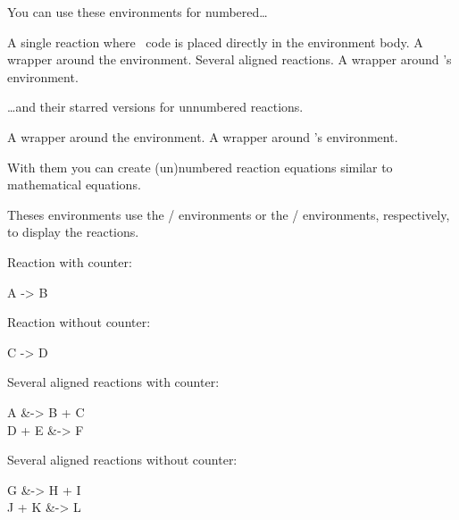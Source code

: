 \documentclass[load-preamble+]{cnltx-doc}
\begin{document}
You can use these environments for numbered\ldots
\begin{environments}
    A single reaction where \chemformula\ code is placed directly in the
    environment body.  A wrapper around the  environment.
    Several aligned reactions.  A wrapper around 's 
    environment.
\end{environments}

\ldots and their starred versions for unnumbered reactions.
\begin{environments}
    A wrapper around the  environment.
    A wrapper around 's  environment.
\end{environments}

With them you can create (un)numbered reaction equations similar to
mathematical equations.

Theses environments use the / environments or
the / environments, respectively, to display the
reactions.

\begin{example}
  Reaction with counter:
  \begin{reaction}
    A -> B
  \end{reaction}
\end{example}

\begin{example}
  Reaction without counter:
  \begin{reaction*}
    C -> D
  \end{reaction*}
\end{example}

\begin{example}
  Several aligned reactions with counter:
  \begin{reactions}
    A     &-> B + C \\
    D + E &-> F
  \end{reactions}
\end{example}

\begin{example}
  Several aligned reactions without counter:
  \begin{reactions*}
    G     &-> H + I \\
    J + K &-> L
  \end{reactions*}
\end{example}
\end{document}
